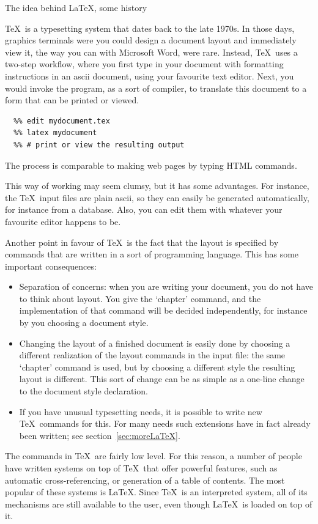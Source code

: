  {The idea behind \LaTeX, some history}

\TeX\ is a typesetting system that dates back to the late 1970s. In
those days, graphics terminals were you could design a document layout
and immediately view it, the way you can with Microsoft Word, were
rare.  Instead, \TeX\ uses a two-step workflow, where you first type
in your document with formatting instructions in an ascii document,
using your favourite text editor.
%
Next, you would invoke the
 program, as a sort of compiler, to translate this document to
a form that can be printed or viewed. 
\begin{verbatim}
  %% edit mydocument.tex
  %% latex mydocument
  %% # print or view the resulting output
\end{verbatim}
The process is comparable to
making web pages by typing HTML commands.

This way of working may seem clumsy, but
it has some advantages. For instance, the \TeX\ input files are plain
ascii, so they can easily be generated automatically, for instance
from a database. Also, you can edit them with whatever your
favourite editor happens to be.

Another point in favour of \TeX\ is the fact that the layout is
specified by commands that are written in a sort of programming
language. This has some important consequences:
\begin{itemize}
\item Separation of concerns: when you are writing your document, you
  do not have to think about layout. You give the `chapter' command,
  and the implementation of that command will be decided
  independently, for instance by you choosing a document style.
\item Changing the layout of a finished document is easily done by
  choosing a different realization of the layout commands in the input file:
  the same `chapter' command is used, but by choosing a different
  style the resulting layout is
  different. This sort of change can be as simple as 
  a one-line change to the document style declaration.
\item If you have unusual typesetting needs, it is possible to write
  new \TeX\ commands for this. For many needs such extensions have in
  fact already been written; see section~\ref{sec:moreLaTeX}.
\end{itemize}

The commands in \TeX\ are fairly low level. For this reason, a number
of people have written systems on top of \TeX\ that offer powerful
features, such as automatic cross-referencing, or generation of a
table of contents. The most popular of these systems is \LaTeX. Since
\TeX\ is an interpreted system, all of its mechanisms are still
available to the user, even though \LaTeX\ is loaded on top of it.

